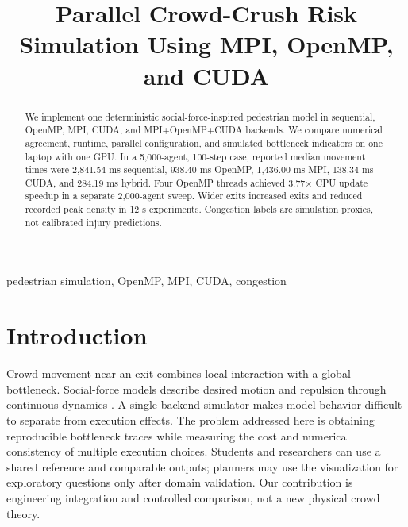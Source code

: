 \documentclass[conference]{IEEEtran}
\begin{document}
\title{Parallel Crowd-Crush Risk Simulation Using MPI, OpenMP, and CUDA}
\author{
}
\maketitle
\begin{abstract}
We implement one deterministic social-force-inspired pedestrian model in sequential, OpenMP, MPI, CUDA, and MPI+OpenMP+CUDA backends. We compare numerical agreement, runtime, parallel configuration, and simulated bottleneck indicators on one laptop with one GPU. In a 5,000-agent, 100-step case, reported median movement times were 2,841.54 ms sequential, 938.40 ms OpenMP, 1,436.00 ms MPI, 138.34 ms CUDA, and 284.19 ms hybrid. Four OpenMP threads achieved 3.77$\times$ CPU update speedup in a separate 2,000-agent sweep. Wider exits increased exits and reduced recorded peak density in 12 s experiments. Congestion labels are simulation proxies, not calibrated injury predictions.
\end{abstract}
\begin{IEEEkeywords}pedestrian simulation, OpenMP, MPI, CUDA, congestion\end{IEEEkeywords}

\section{Introduction}
Crowd movement near an exit combines local interaction with a global bottleneck. Social-force models describe desired motion and repulsion through continuous dynamics \cite{helbing1995,helbing2000}. A single-backend simulator makes model behavior difficult to separate from execution effects. The problem addressed here is obtaining reproducible bottleneck traces while measuring the cost and numerical consistency of multiple execution choices. Students and researchers can use a shared reference and comparable outputs; planners may use the visualization for exploratory questions only after domain validation. Our contribution is engineering integration and controlled comparison, not a new physical crowd theory.
\end{document}
